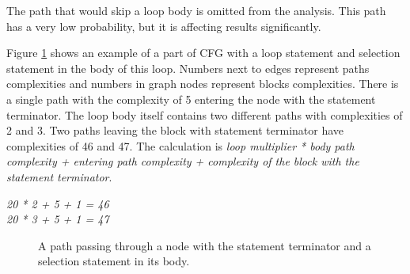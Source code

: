 The path that would skip a loop body is omitted from the analysis. This path has a very low probability, but it is affecting results significantly.

Figure \ref{yield-loop} shows an example of a part of CFG with a  loop statement and  selection statement in the body of this loop. Numbers next to edges represent paths complexities and numbers in graph nodes represent blocks complexities. There is a single path with the complexity of 5 entering the node with the  statement terminator. The loop body itself contains two different paths with complexities of 2 and 3. Two paths leaving the block with  statement terminator have complexities of 46 and 47. The calculation is \emph{ loop multiplier * body path complexity + entering path complexity + complexity of the block with the  statement terminator}.

\begin{center}
\emph{20 * 2 + 5 + 1 = 46}\\
\emph{20 * 3 + 5 + 1 = 47}
\end{center}

\begin{figure}[h!]
\centering
\caption{A path passing through a node with the  statement terminator and a selection statement in its body.}
\label{yield-loop}
\vspace{0.5cm}
\end{figure}

